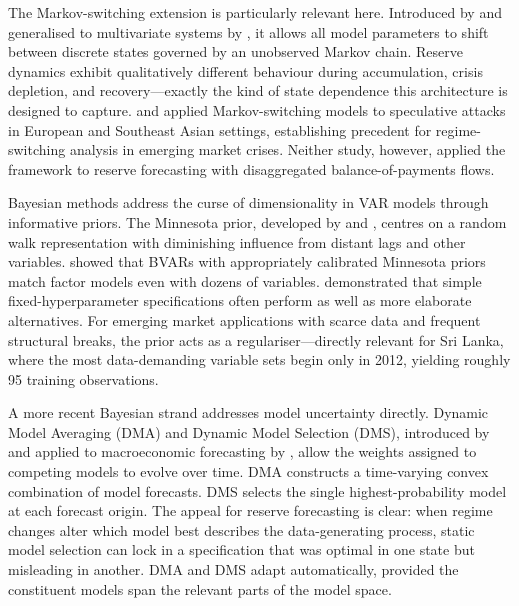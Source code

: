 \documentclass[12pt,a4paper]{article}
\begin{document}
The Markov-switching extension is particularly relevant here. Introduced by \cite{Hamilton1989} and generalised to multivariate systems by \cite{Krolzig1997}, it allows all model parameters to shift between discrete states governed by an unobserved Markov chain. Reserve dynamics exhibit qualitatively different behaviour during accumulation, crisis depletion, and recovery---exactly the kind of state dependence this architecture is designed to capture. \cite{Peria2002} and \cite{BrunettiMarianoScottiTan2007} applied Markov-switching models to speculative attacks in European and Southeast Asian settings, establishing precedent for regime-switching analysis in emerging market crises. Neither study, however, applied the framework to reserve forecasting with disaggregated balance-of-payments flows.

Bayesian methods address the curse of dimensionality in VAR models through informative priors. The Minnesota prior, developed by \cite{Litterman1986} and \cite{DoanLittermanSims1984}, centres on a random walk representation with diminishing influence from distant lags and other variables. \cite{Banbura2010} showed that BVARs with appropriately calibrated Minnesota priors match factor models even with dozens of variables. \cite{Carriero2015} demonstrated that simple fixed-hyperparameter specifications often perform as well as more elaborate alternatives. For emerging market applications with scarce data and frequent structural breaks, the prior acts as a regulariser---directly relevant for Sri Lanka, where the most data-demanding variable sets begin only in 2012, yielding roughly 95 training observations.

A more recent Bayesian strand addresses model uncertainty directly. Dynamic Model Averaging (DMA) and Dynamic Model Selection (DMS), introduced by \cite{Raftery2010} and applied to macroeconomic forecasting by \cite{KoopKorobilis2012}, allow the weights assigned to competing models to evolve over time. DMA constructs a time-varying convex combination of model forecasts. DMS selects the single highest-probability model at each forecast origin. The appeal for reserve forecasting is clear: when regime changes alter which model best describes the data-generating process, static model selection can lock in a specification that was optimal in one state but misleading in another. DMA and DMS adapt automatically, provided the constituent models span the relevant parts of the model space.
\end{document}

